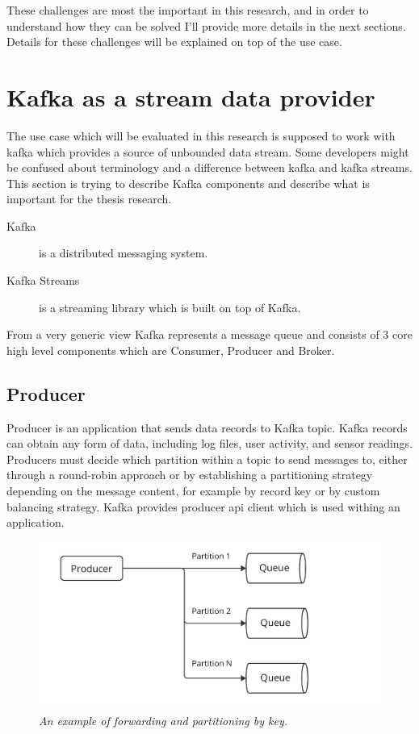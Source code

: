 These challenges are most the important in this research, and in order to
understand how they can be solved I'll provide more details in the next sections.
Details for these challenges will be explained on top of the use case.

\newpage
\section{Kafka as a stream data provider}\label{sec:kafka-as-a-data-provider:-challenges}
The use case which will be evaluated in this research is supposed to work with kafka which
provides a source of unbounded data stream.
Some developers might be confused about terminology and a difference
between kafka and kafka streams.
This section is trying to describe Kafka components and describe what is important
for the thesis research.

\begin{description}
    \item[Kafka] is a distributed messaging system.
    \item[Kafka Streams] is a streaming library which is built on top of Kafka.
\end{description}

From a very generic view Kafka represents a message queue and consists
of 3 core high level components which are Consumer, Producer and Broker.

\subsection{Producer}\label{subsec:producer}
Producer is an application that sends data
records to Kafka topic.
Kafka records can obtain any form of data, including log files, user activity, and sensor readings.
Producers must decide which partition within a topic to send messages to,
either through a round-robin approach or by establishing a partitioning strategy
depending on the message content, for example by record key or by custom balancing strategy.
Kafka provides producer api client which is used withing an application.

\begin{figure}[H]
    \centering
    \includegraphics[width=1\textwidth]{figures/producer}
    \caption{\textit{An example of forwarding and partitioning by key.}}
    \label{fig:producer}
\end{figure}

